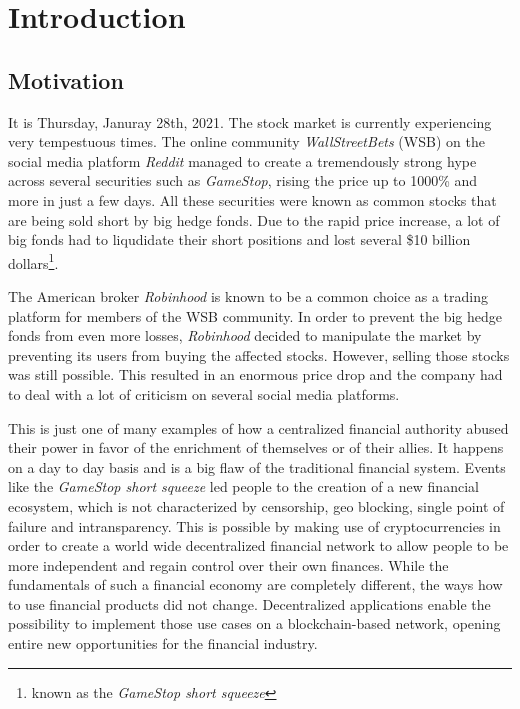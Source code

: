 \chapter{Introduction}
\label{cha:Introduction}

\section{Motivation}
It is Thursday, Januray 28th, 2021. The stock market is currently experiencing very tempestuous times. The online community \textit{WallStreetBets} (WSB)
on the social media platform \textit{Reddit} managed to create a tremendously strong hype across several securities such as \textit{GameStop}, rising
the price up to 1000\% and more in just a few days. All these securities were known as common stocks that are being sold short by big hedge fonds.
Due to the rapid price increase, a lot of big fonds had to liqudidate their short positions and lost several \$10 billion dollars\footnote{known as the \textit{GameStop short squeeze}}.

The American
broker \textit{Robinhood} is known to be a common choice as a trading platform for members of the WSB community. In order to prevent the big hedge
fonds from even more losses, \textit{Robinhood} decided to manipulate the market by preventing its users from buying the affected stocks. However, selling those
stocks was still possible. This resulted in an enormous price drop and the company had to deal with a lot of criticism on several social media platforms.

This is just one of many examples of how a centralized financial authority abused their power in favor of the enrichment of themselves or of their allies.
It happens on a day to day basis and is a big flaw of the traditional financial system. Events like the \textit{GameStop short squeeze} led people to
the creation of a new financial ecosystem, which is not characterized by censorship, geo blocking, single point of failure and intransparency. This is
possible by making use of cryptocurrencies in order to create a world wide decentralized financial network to allow people to be more independent and
regain control over their own finances. While the fundamentals of such a financial economy are completely different, the ways how to use financial
products did not change. Decentralized applications enable the possibility to implement those use cases on a blockchain-based network, opening entire
new opportunities for the financial industry.

